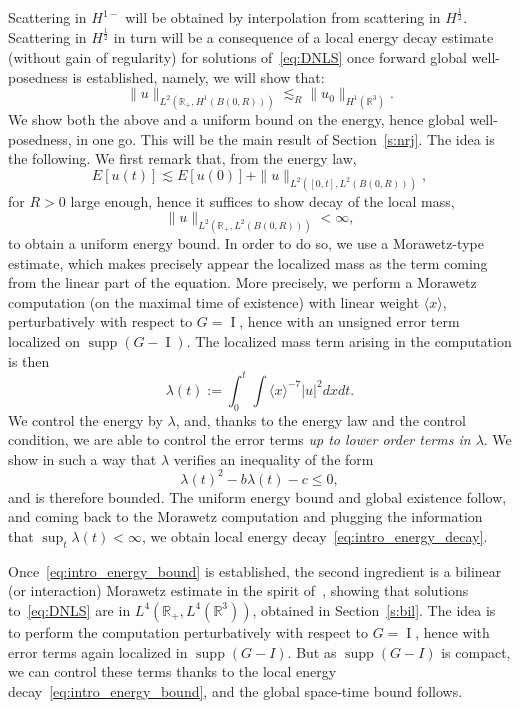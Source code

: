 \documentclass[AHL,Unicode,longabstracts,published]{cedram}
\newcommand*\R{\mathbb{R}}
\DeclareMathOperator{\I}{I}
\DeclareMathOperator{\supp}{supp}
\begin{document}
Scattering in $H^{1-}$ will be obtained by interpolation from scattering in $H^{\frac 12}$. Scattering in $H^{\frac 12}$ in turn will be a consequence of a local energy decay estimate (without gain of regularity) for solutions of~\eqref{eq:DNLS} once forward global well-posedness is established, namely, we will show that:
\begin{equation}\label{eq:intro_energy_decay}
\| u \|_{L^2\left(\R_+, H^1(B(0, R))\right)} \lesssim_R \| u_0 \|_{H^1(\R^3)}.
\end{equation}
We show both the above and a uniform bound on the energy, hence global well-posedness, in one go. This will be the main result of Section~\ref{s:nrj}. The idea is the following. We first remark that, from the energy law,
\begin{equation}\label{eq:intro_energy_bound}
E[u(t)] \lesssim E[u(0)] + \| u \|_{L^2\left([0, t], L^2(B(0, R))\right)},
\end{equation}
for $R>0$ large enough, hence it suffices to show decay of the local mass,
\[
\| u \|_{L^2\left(\R_+, L^2(B(0, R))\right)}<\infty,
\]
to obtain a uniform energy bound. In order to do so, we use a Morawetz-type estimate, which makes precisely appear the localized mass as the term coming from the linear part of the equation. More precisely, we perform a Morawetz computation (on the maximal time of existence) with linear weight $\langle x \rangle$, perturbatively with respect to $G = \I$, hence with an unsigned error term localized on $\supp(G-\I)$. The localized mass term arising in the computation is then
\[
\lambda(t) := \int_0^t \int \langle x\rangle^{-7}|u|^2 dxdt.
\]
We control the energy by $\lambda$, and, thanks to the energy law and the control condition, we are able to control the error terms \emph{up to lower order terms in $\lambda$}. We show in such a way that $\lambda$ verifies an inequality of the form
\[
\lambda(t)^2 - b\lambda(t) - c \leq 0,
\]
and is therefore bounded. The uniform energy bound and global existence follow, and coming back to the Morawetz computation and plugging the information that $\sup_t \lambda(t) < \infty$, we obtain local energy decay~\eqref{eq:intro_energy_decay}.

Once~\eqref{eq:intro_energy_bound} is established, the second ingredient is a bilinear (or interaction) Morawetz estimate in the spirit of~\cite{CoKeStTaTa04,PV1}, showing that solutions to~\eqref{eq:DNLS} are in $L^4(\R_+, L^4(\R^3))$, obtained in Section~\ref{s:bil}. The idea is to perform the computation perturbatively with respect to $G= \I$, hence with error terms again localized in $\supp(G-I)$. But as $\supp(G-I)$ is compact, we can control these terms thanks to the local energy decay~\eqref{eq:intro_energy_bound}, and the global space-time bound follows.
\end{document}
